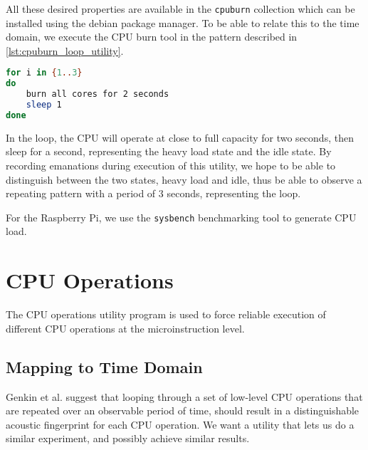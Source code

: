 All these desired properties are available in the \texttt{cpuburn} collection which can be installed using the debian package manager\footnotemark.
To be able to relate this to the time domain, we execute the \gls{CPU} burn tool in the pattern described in \autoref{lst:cpuburn_loop_utility}.


\begin{lstlisting}[language=BASH, caption={Mapping execution to the time domain: CPU Burn Utility}, label={lst:cpuburn_loop_utility}]
for i in {1..3}
do
	burn all cores for 2 seconds
	sleep 1
done
\end{lstlisting}

In the loop, the \gls{CPU} will operate at close to full capacity for two seconds, then sleep for a second, representing the heavy load state and the idle state.
By recording emanations during execution of this utility, we hope to be able to distinguish between the two states, heavy load and idle, thus be able to observe a repeating pattern with a period of \(3\) seconds, representing the loop.

For the Raspberry Pi, we use the \texttt{sysbench}\footnotemark{} benchmarking tool to generate \gls{CPU} load.


\section{CPU Operations}\label{chp4:sec:microinstructions}

The CPU operations utility program is used to force reliable execution of different CPU operations at the microinstruction level.

\subsection{Mapping to Time Domain}\label{chp4:sec:mapping_to_time_domain}
Genkin et al. suggest that looping through a set of low-level CPU operations that are repeated over an observable period of time, should result in a distinguishable acoustic fingerprint for each \gls{CPU} operation.
We want a utility that lets us do a similar experiment, and possibly achieve similar results.

